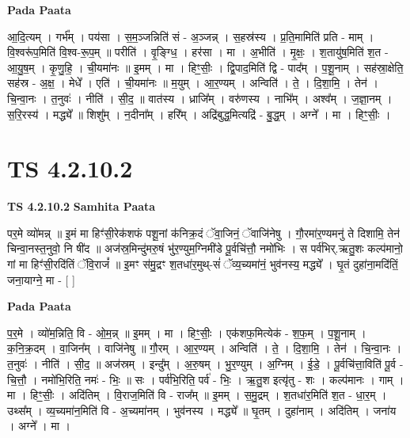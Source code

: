 \documentclass[17pt]{extarticle}
\begin{document}
\textbf{Pada Paata} \newline

आ॒दि॒त्यम् । गर्भ᳚म् । पय॑सा । स॒म॒ञ्जन्निति॑ सं - अ॒ञ्जन्न् । स॒हस्र॑स्य । प्र॒ति॒मामिति॑ प्रति - माम् । वि॒श्वरू॑प॒मिति॑ वि॒श्व-रू॒प॒म् ॥ परीति॑ । वृ॒ङ्ग्धि॒ । हर॑सा । मा । अ॒भीति॑ । मृ॒क्षः॒ । श॒तायु॑ष॒मिति॑ श॒त - आ॒यु॒ष॒म् । कृ॒णु॒हि॒ । ची॒यमा॑नः ॥ इ॒मम् । मा । हिꣳ॒॒सीः॒ । द्वि॒पाद॒मिति॑ द्वि - पाद᳚म् । प॒शू॒नाम् । सह॑स्रा॒क्षेति॒ सह॑स्र - अ॒क्ष॒ । मेधे᳚ । एति॑ । ची॒यमा॑नः ॥ म॒युम् । आ॒र॒ण्यम् । अन्विति॑ । ते॒ । दि॒शा॒मि॒ । तेन॑ । चि॒न्वा॒नः । त॒नुवः॑ । नीति॑ । सी॒द॒ ॥ वात॑स्य । ध्राजि᳚म् । वरु॑णस्य । नाभि᳚म् । अश्व᳚म् । ज॒ज्ञा॒नम् । स॒रि॒रस्य॑ । मद्ध्ये᳚ ॥ शिशु᳚म् । न॒दीना᳚म् । हरि᳚म् । अद्रि॑बुद्ध॒मित्यद्रि॑ - बु॒द्ध॒म् । अग्ने᳚ । मा । हिꣳ॒॒सीः॒ ।  \newline





\section{ TS 4.2.10.2 }

\textbf{TS 4.2.10.2 } \newline
\textbf{Samhita Paata} \newline

पर॒मे व्यो॑मन्न् ॥ इ॒मं मा हिꣳ॑सी॒रेक॑शफं पशू॒नां क॑निक्र॒दं ॅवा॒जिनं॒ ॅवाजि॑नेषु । गौ॒रमा॑र॒ण्यमनु॑ ते दिशामि॒ तेन॑ चिन्वा॒नस्त॒नुवो॒ नि षी॑द ॥ अज॑स्र॒मिन्दु॑मरु॒षं भु॑र॒ण्युम॒ग्निमी॑डे पू॒र्वचि॑त्तौ॒ नमो॑भिः । स पर्व॑भिर्.ऋतु॒शः कल्प॑मानो॒ गां मा हिꣳ॑सी॒रदि॑तिं ॅवि॒राजं᳚ ॥ इ॒मꣳ स॑मु॒द्रꣳ श॒तधा॑र॒मुथ्-सं॑ ॅव्य॒च्यमा॑नं॒ भुव॑नस्य॒ मद्ध्ये᳚ । घृ॒तं दुहा॑ना॒मदि॑तिं॒ जना॒याग्ने॒ मा - [  ] \newline

\textbf{Pada Paata} \newline

प॒र॒मे । व्यो॑म॒न्निति॒ वि - ओ॒म॒न्न् ॥ इ॒मम् । मा । हिꣳ॒॒सीः॒ । एक॑शफ॒मित्येक॑ - श॒फ॒म् । प॒शू॒नाम् । क॒नि॒क्र॒दम् । वा॒जिन᳚म् । वाजि॑नेषु ॥ गौ॒रम् । आ॒र॒ण्यम् । अन्विति॑ । ते॒ । दि॒शा॒मि॒ । तेन॑ । चि॒न्वा॒नः । त॒नुवः॑ । नीति॑ । सी॒द॒ ॥ अज॑स्रम् । इन्दु᳚म् । अ॒रु॒षम् । भु॒र॒ण्युम् । अ॒ग्निम् । ई॒डे॒ । पू॒र्वचि॑त्ता॒विति॑ पू॒र्व - चि॒त्तौ॒ । नमो॑भि॒रिति॒ नमः॑ - भिः॒ ॥ सः । पर्व॑भि॒रिति॒ पर्व॑ - भिः॒ । ऋ॒तु॒श इत्यृ॑तु - शः । कल्प॑मानः । गाम् । मा । हिꣳ॒॒सीः॒ । अदि॑तिम् । वि॒राज॒मिति॑ वि - राज᳚म् ॥ इ॒मम् । स॒मु॒द्रम् । श॒तधा॑र॒मिति॑ श॒त - धा॒र॒म् । उथ्स᳚म् । व्य॒च्यमा॑न॒मिति॑ वि - अ॒च्यमा॑नम् । भुव॑नस्य । मद्ध्ये᳚ ॥ घृ॒तम् । दुहा॑नाम् । अदि॑तिम् । जना॑य । अग्ने᳚ । मा ।  \newline
\end{document}
